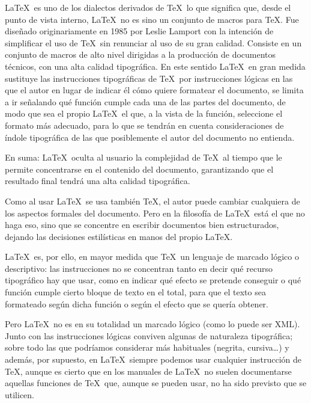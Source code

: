 		\LaTeX\ es uno de los dialectos derivados de \TeX\, lo que significa que, desde el punto de vista interno, \LaTeX\ no es sino un conjunto de macros para \TeX. Fue diseñado originariamente en 1985 por Leslie Lamport con la intención de simplificar el uso de \TeX\ sin renunciar al uso de su gran calidad. Consiste en un conjunto de macros de alto nivel dirigidas a la producción de documentos técnicos, con una alta calidad tipográfica. En este sentido \LaTeX\ en gran medida sustituye las instrucciones tipográficas de \TeX\ por instrucciones lógicas en las que el autor en lugar de indicar él cómo quiere formatear el documento, se limita a ir señalando qué función cumple cada una de las partes del documento, de modo que sea el propio \LaTeX\ el que, a la vista de la función, seleccione el formato más adecuado, para lo que se tendrán en cuenta consideraciones de índole tipográfica de las que posiblemente el autor del documento no entienda.
		
		En suma: \LaTeX\ oculta al usuario la complejidad de \TeX\, al tiempo que le permite concentrarse en el contenido del documento, garantizando que el resultado final tendrá una alta calidad tipográfica.
		
		Como al usar \LaTeX\ se usa también \TeX, el autor puede cambiar cualquiera de los aspectos formales del documento. Pero en la filosofía de \LaTeX\ está el que no haga eso, sino que se concentre en escribir documentos bien estructurados, dejando las decisiones estilísticas en manos del propio \LaTeX.
		
		\LaTeX\ es, por ello, en mayor medida que \TeX\ un lenguaje de marcado lógico o descriptivo: las instrucciones no se concentran tanto en decir qué recurso tipográfico hay que usar, como en indicar qué efecto se pretende conseguir o qué función cumple cierto bloque de texto en el total, para que el texto sea formateado según dicha función o según el efecto que se quería obtener.
		
		Pero \LaTeX\ no es en su totalidad un marcado lógico (como lo puede ser XML). Junto con las instrucciones lógicas conviven algunas de naturaleza tipográfica; sobre todo las que podríamos considerar más habituales (negrita, cursiva…) y además, por supuesto, en \LaTeX\ siempre podemos usar cualquier instrucción de \TeX, aunque es cierto que en los manuales de \LaTeX\ no suelen documentarse aquellas funciones de \TeX\ que, aunque se pueden usar, no ha sido previsto que se utilicen.
		
	\section{\LaTeXe}
		
